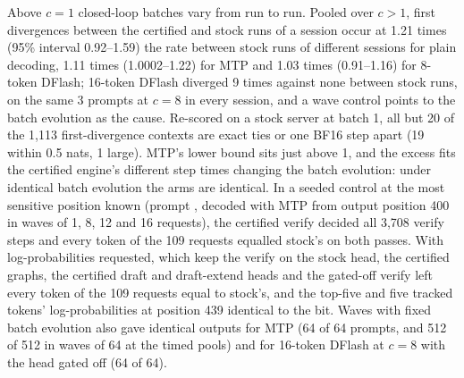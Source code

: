 Above $c=1$ closed-loop batches vary from run to run. Pooled over $c>1$, first divergences between the certified and stock runs of a session occur at 1.21 times (95\% interval 0.92--1.59) the rate between stock runs of different sessions for plain decoding, 1.11 times (1.0002--1.22) for MTP and 1.03 times (0.91--1.16) for 8-token DFlash; 16-token DFlash diverged 9 times against none between stock runs, on the same 3 prompts at $c=8$ in every session, and a wave control points to the batch evolution as the cause. Re-scored on a stock server at batch 1, all but 20 of the 1,113 first-divergence contexts are exact ties or one BF16 step apart (19 within 0.5 nats, 1 large). MTP's lower bound sits just above 1, and the excess fits the certified engine's different step times changing the batch evolution: under identical batch evolution the arms are identical. In a seeded control at the most sensitive position known (prompt , decoded with MTP from output position 400 in waves of 1, 8, 12 and 16 requests), the certified verify decided all 3,708 verify steps and every token of the 109 requests equalled stock's on both passes. With log-probabilities requested, which keep the verify on the stock head, the certified graphs, the certified draft and draft-extend heads and the gated-off verify left every token of the 109 requests equal to stock's, and the top-five and five tracked tokens' log-probabilities at position 439 identical to the bit. Waves with fixed batch evolution also gave identical outputs for MTP (64 of 64 prompts, and 512 of 512 in waves of 64 at the timed pools) and for 16-token DFlash at $c=8$ with the head gated off (64 of 64).

